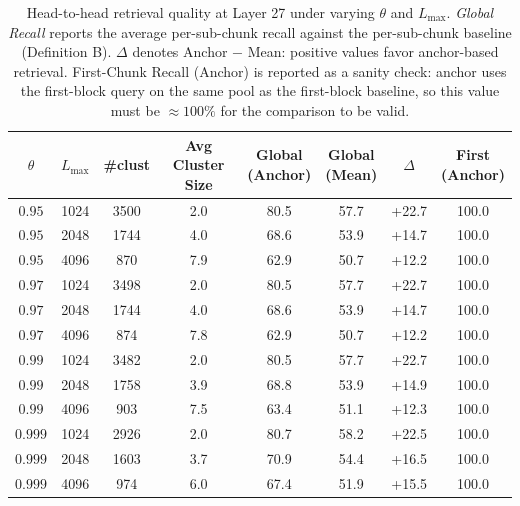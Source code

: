 \begin{table}[t]
\centering
\caption{Head-to-head retrieval quality at Layer 27 
under varying $\theta$ and $L_{\max}$. \textit{Global Recall} reports the 
average per-sub-chunk recall against the per-sub-chunk baseline (Definition B). 
$\Delta$ denotes Anchor $-$ Mean: positive values favor anchor-based retrieval. 
First-Chunk Recall (Anchor) is reported as a sanity check: anchor uses the 
first-block query on the same pool as the first-block baseline, so this 
value must be $\approx 100\%$ for the comparison to be valid.}
\label{tab:anchor-vs-mean}
\small
\begin{tabular}{cccccccc}
\toprule
$\theta$ & $L_{\max}$ & \#clust & \makecell{Avg Cluster\\Size} & \makecell{Global\\(Anchor)} & \makecell{Global\\(Mean)} & $\Delta$ & \makecell{First\\(Anchor)} \\
\midrule
$0.95$ & 1024 & 3500 & 2.0 & 80.5 & 57.7 & +22.7 & 100.0 \\
$0.95$ & 2048 & 1744 & 4.0 & 68.6 & 53.9 & +14.7 & 100.0 \\
$0.95$ & 4096 & 870 & 7.9 & 62.9 & 50.7 & +12.2 & 100.0 \\
\midrule
$0.97$ & 1024 & 3498 & 2.0 & 80.5 & 57.7 & +22.7 & 100.0 \\
$0.97$ & 2048 & 1744 & 4.0 & 68.6 & 53.9 & +14.7 & 100.0 \\
$0.97$ & 4096 & 874 & 7.8 & 62.9 & 50.7 & +12.2 & 100.0 \\
\midrule
$0.99$ & 1024 & 3482 & 2.0 & 80.5 & 57.7 & +22.7 & 100.0 \\
$0.99$ & 2048 & 1758 & 3.9 & 68.8 & 53.9 & +14.9 & 100.0 \\
$0.99$ & 4096 & 903 & 7.5 & 63.4 & 51.1 & +12.3 & 100.0 \\
\midrule
$0.999$ & 1024 & 2926 & 2.0 & 80.7 & 58.2 & +22.5 & 100.0 \\
$0.999$ & 2048 & 1603 & 3.7 & 70.9 & 54.4 & +16.5 & 100.0 \\
$0.999$ & 4096 & 974 & 6.0 & 67.4 & 51.9 & +15.5 & 100.0 \\
\bottomrule
\end{tabular}
\end{table}
